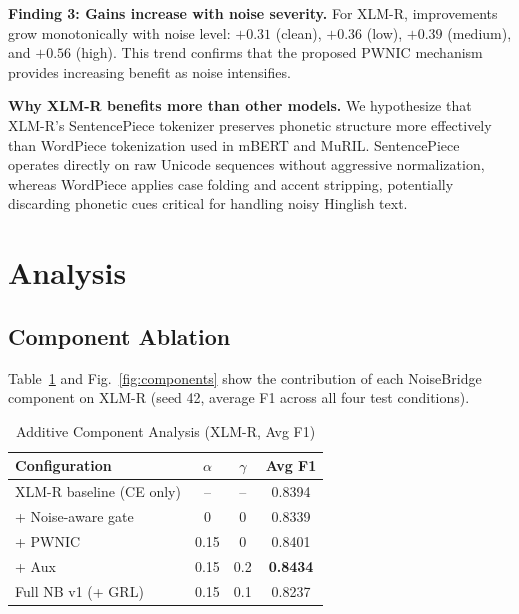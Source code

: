 \documentclass[conference]{IEEEtran}
\begin{document}
\textbf{Finding 3: Gains increase with noise severity.}
For XLM-R, improvements grow monotonically with noise level: $+0.31$ (clean), $+0.36$ (low), $+0.39$ (medium), and $+0.56$ (high). This trend confirms that the proposed PWNIC mechanism provides increasing benefit as noise intensifies.

\textbf{Why XLM-R benefits more than other models.}
We hypothesize that XLM-R's SentencePiece tokenizer preserves phonetic structure more effectively than WordPiece tokenization used in mBERT and MuRIL. SentencePiece operates directly on raw Unicode sequences without aggressive normalization, whereas WordPiece applies case folding and accent stripping, potentially discarding phonetic cues critical for handling noisy Hinglish text.

\section{Analysis}
\label{sec:analysis}

\subsection{Component Ablation}

Table~\ref{tab:components} and Fig.~\ref{fig:components} show the contribution of each NoiseBridge component on XLM-R (seed 42, average F1 across all four test conditions).

\begin{table}[H]
\caption{Additive Component Analysis (XLM-R, Avg F1)}
\label{tab:components}
\centering
\small
\begin{tabular}{lccc}
\toprule
\textbf{Configuration} & $\alpha$ & $\gamma$ & \textbf{Avg F1} \\
\midrule
XLM-R baseline (CE only) & -- & -- & 0.8394 \\
\quad + Noise-aware gate  & 0   & 0   & 0.8339 \\
\quad\quad + PWNIC         & 0.15& 0   & 0.8401 \\
\quad\quad\quad + Aux      & 0.15& 0.2 & \textbf{0.8434} \\
\midrule
Full NB v1 (+ GRL)        & 0.15& 0.1 & 0.8237 \\
\bottomrule
\end{tabular}
\end{table}
\end{document}
